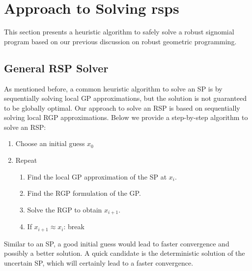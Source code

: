 \section{Approach to Solving \gls{rsp}s}

This section presents a heuristic algorithm to safely solve a robust signomial program based on our previous discussion on robust geometric programming. 

\subsection{General RSP Solver}
As mentioned before, a common heuristic algorithm to solve an SP is by sequentially solving local GP approximations, but the solution is not guaranteed to be globally optimal. Our approach to solve an RSP is based on sequentially solving local RGP approximations. Below we provide a step-by-step algorithm to solve an RSP:

\begin{enumerate}
    \item Choose an initial guess $x_0$
    \item Repeat
    \begin{enumerate}
        \item Find the local GP approximation of the SP at $x_i$.
        \item Find the RGP formulation of the GP.
        \item Solve the RGP to obtain $x_{i+1}$.
        \item If $x_{i+1} \approx x_{i}$: break
    \end{enumerate}
\end{enumerate}

Similar to an SP, a good initial guess would lead to faster convergence and possibly a better solution. A quick candidate is the deterministic solution of the uncertain SP, which will certainly lead to a faster convergence.


